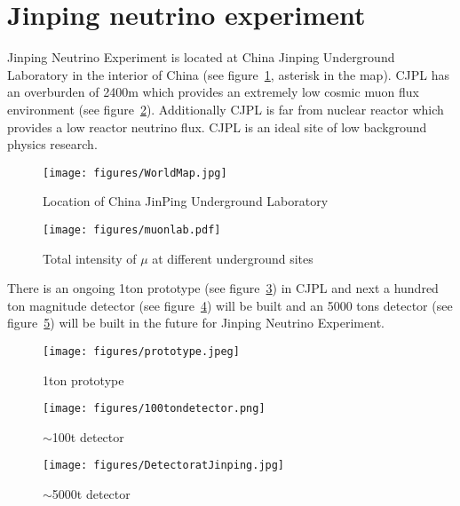 \section{Jinping neutrino experiment} %
Jinping Neutrino Experiment is located at China Jinping Underground Laboratory in the interior of China (see figure~\ref{fig:cjpl}, asterisk in the map). CJPL has an overburden of 2400m which provides an extremely low cosmic muon flux environment (see figure~\ref{fig:muon}). Additionally CJPL is far from nuclear reactor which provides a low reactor neutrino flux. CJPL is an ideal site of low background physics research. 

\begin{minipage}{.55\textwidth}
\begin{figure}[H]
    \centering
    \texttt{[image: figures/WorldMap.jpg]}
    \caption{\label{fig:cjpl} Location of China JinPing Underground Laboratory}
\end{figure}
\end{minipage}
\begin{minipage}{.45\textwidth}
\begin{figure}[H]
    \centering
    \texttt{[image: figures/muonlab.pdf]}
    \caption{\label{fig:muon} Total intensity of $\mu$ at different underground sites}
\end{figure}
\end{minipage}

There is an ongoing 1ton prototype (see figure~\ref{fig:1t}) in CJPL and next a hundred ton magnitude detector (see figure~\ref{fig:100t}) will be built and an 5000 tons detector (see figure~\ref{fig:1kt}) will be built in the future for Jinping Neutrino Experiment. 

\begin{minipage}{.3\textwidth}
\begin{figure}[H]
    \centering
    \texttt{[image: figures/prototype.jpeg]}
    \caption{\label{fig:1t} 1ton prototype}
\end{figure}
\end{minipage}
\begin{minipage}{.3\textwidth}
\begin{figure}[H]
    \centering
    \texttt{[image: figures/100tondetector.png]}
    \caption{\label{fig:100t} $\sim$100t detector}
\end{figure}
\end{minipage}
\begin{minipage}{.3\textwidth}
\begin{figure}[H]
    \centering
    \texttt{[image: figures/DetectoratJinping.jpg]}
    \caption{\label{fig:1kt} $\sim$5000t detector}
\end{figure}
\end{minipage}

